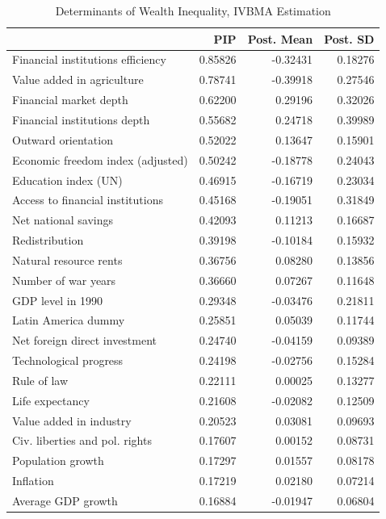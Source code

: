 \begin{refsection}
\begin{table}[!ht]
	\footnotesize
	\centering
	\caption{Determinants of Wealth Inequality, \ac{IVBMA} Estimation}
	\label{ch3table:res_endo}
	\begin{threeparttable}
	\begin{tabular}{lrrr}
		\toprule
		& \ac{PIP} & Post. Mean & Post. SD\\ 
		\midrule
		Financial institutions efficiency & 0.85826 & -0.32431 & 0.18276 \\ 
		Value added in agriculture & 0.78741 & -0.39918 & 0.27546 \\ 
		Financial market depth & 0.62200 & 0.29196 & 0.32026 \\ 
		Financial institutions depth & 0.55682 & 0.24718 & 0.39989 \\ 
		Outward orientation & 0.52022 & 0.13647 & 0.15901 \\ 
		Economic freedom index (adjusted) & 0.50242 & -0.18778 & 0.24043 \\ 
		Education index (UN) & 0.46915 & -0.16719 & 0.23034 \\ 
		Access to financial institutions & 0.45168 & -0.19051 & 0.31849 \\ 
		Net national savings & 0.42093 & 0.11213 & 0.16687 \\ 
		Redistribution & 0.39198 & -0.10184 & 0.15932 \\ 
		Natural resource rents & 0.36756 & 0.08280 & 0.13856 \\ 
		Number of war years & 0.36660 & 0.07267 & 0.11648 \\ 
		GDP level in 1990 & 0.29348 & -0.03476 & 0.21811 \\ 
		Latin America dummy & 0.25851 & 0.05039 & 0.11744 \\ 
		Net foreign direct investment & 0.24740 & -0.04159 & 0.09389 \\ 
		Technological progress & 0.24198 & -0.02756 & 0.15284 \\ 
		Rule of law & 0.22111 & 0.00025 & 0.13277 \\ 
		Life expectancy & 0.21608 & -0.02082 & 0.12509 \\ 
		Value added in industry & 0.20523 & 0.03081 & 0.09693 \\ 
		Civ. liberties and pol. rights & 0.17607 & 0.00152 & 0.08731 \\ 
		Population growth & 0.17297 & 0.01557 & 0.08178 \\ 
		Inflation & 0.17219 & 0.02180 & 0.07214 \\ 
		Average GDP growth & 0.16884 & -0.01947 & 0.06804 \\ 

\end{tabular}
\end{threeparttable}
\end{table}
\end{refsection}
